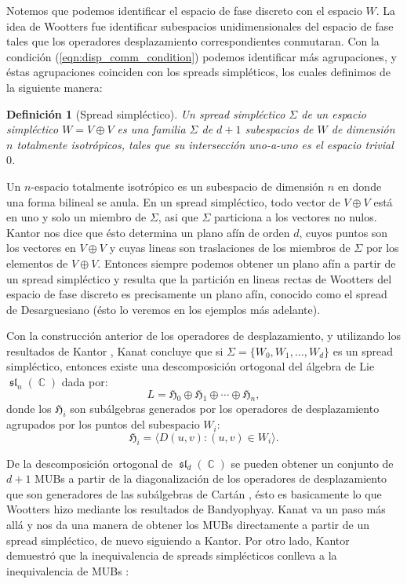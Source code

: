 \documentclass[a4paper]{report}
\DeclareMathOperator{\C}{\mathbb{C}}
\DeclareMathOperator{\Sl}{\mathfrak{sl}}
\newtheorem{definition}{Definición}
\begin{document}
  Notemos que podemos identificar el espacio de fase
  discreto con el espacio $W$. La idea de Wootters fue
  identificar subespacios unidimensionales del espacio de
  fase tales que los operadores desplazamiento
  correspondientes conmutaran.  Con la condición
  (\ref{eqn:disp_comm_condition}) podemos identificar más
  agrupaciones, y éstas agrupaciones coinciden con los
  spreads simpléticos, los cuales definimos de la siguiente
  manera:
  \begin{definition}[Spread simpléctico]
    Un spread simpléctico $\Sigma$ de un espacio simpléctico
    $W = V \oplus V$ es una familia $\Sigma$ de $d+1$
    subespacios de $W$ de dimensión $n$ totalmente
    isotrópicos, tales que su intersección uno-a-uno es el
    espacio trivial $0$. 
  \end{definition}
  Un $n$-espacio totalmente isotrópico es un subespacio de
  dimensión $n$ en donde una forma bilineal se anula. En un
  spread simpléctico, todo vector de $V \oplus V$ está en
  uno y solo un miembro de $\Sigma$, asi que $\Sigma$
  particiona a los vectores no nulos. Kantor nos dice que
  ésto determina un plano afín de orden $d$, cuyos puntos
  son los vectores en $V \oplus V$ y cuyas lineas son
  traslaciones de los miembros de $\Sigma$ por los elementos
  de $V \oplus V$. Entonces siempre podemos obtener un plano
  afín a partir de un spread simpléctico y resulta que la
  partición en lineas rectas de Wootters del espacio de fase
  discreto es precisamente un plano afín, conocido como el
  spread de Desarguesiano (ésto lo veremos en los ejemplos
  más adelante).

  Con la construcción anterior de los operadores de
  desplazamiento, y utilizando los resultados de Kantor
  \cite{kantor1996}, Kanat concluye que si $\Sigma = \{W_0,
  W_1, \ldots, W_d\}$ es un spread simpléctico, entonces
  existe una descomposición ortogonal del álgebra de Lie
  $\Sl_n(\C)$ dada por:
  \begin{equation}
    L
    = \mathfrak{H}_0 \oplus \mathfrak{H}_1 \oplus \cdots
    \oplus \mathfrak{H}_n,
  \end{equation}
  donde los $\mathfrak{H}_i$ son subálgebras generados por
  los operadores de desplazamiento agrupados por los
  puntos del subespacio $W_i$:
  \begin{equation}
    \mathfrak{H}_i = \langle D(u,v) : (u,v) \in W_i \rangle.
  \end{equation}

  De la descomposición ortogonal de $\Sl_d(\C)$ se pueden
  obtener un conjunto de $d+1$ MUBs a partir de la
  diagonalización de los operadores de desplazamiento que
  son generadores de las subálgebras de Cartán
  \cite{boykin2005}, ésto es basicamente lo que Wootters
  hizo mediante los resultados de Bandyophyay. Kanat va un
  paso más allá y nos da una manera de obtener los MUBs
  directamente a partir de un spread simpléctico, de nuevo
  siguiendo a Kantor. Por otro lado, Kantor demuestró que la
  inequivalencia de spreads simplécticos conlleva a la
  inequivalencia de MUBs \cite{kantor2012}:
\end{document}
